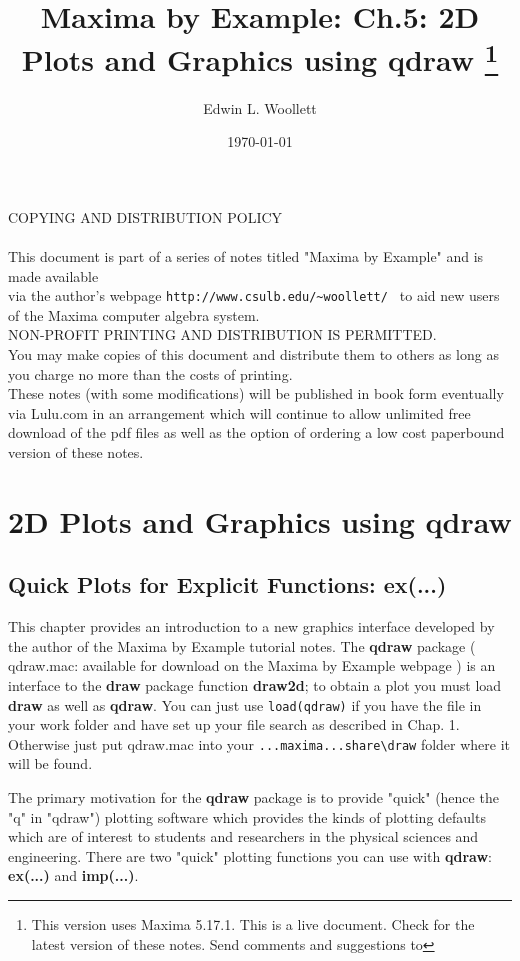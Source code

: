 \documentclass[12pt]{article}
\title{Maxima by Example: Ch.5: 2D Plots and Graphics using qdraw 
            \thanks{This version uses Maxima 5.17.1. This is a live
            document. Check \;  \tedhome \; for the latest version of these notes. Send comments and
			 suggestions to \tedmail } }
\author{Edwin L. Woollett}
\date{\today}
\begin{document}
\maketitle
\tableofcontents
{}
\newpage
\setcounter{section}{4}
\newpage
COPYING AND DISTRIBUTION POLICY\\
\\    
	
    
    This document is part of a series of notes titled
    "Maxima by Example" and	is made available\\
	via the author's webpage 
	\verb|http://www.csulb.edu/~woollett/ | to aid
	new users of the Maxima computer algebra system.\\
	
	\smallskip
	NON-PROFIT PRINTING AND DISTRIBUTION IS PERMITTED.\\
	You may make copies of this document and distribute them to others
	as long as you charge no more than the costs of printing.\\
	
	\smallskip
	These notes (with some modifications) will be published in book form
	eventually via Lulu.com in an arrangement which will continue
	to allow unlimited free download of the pdf files as well as the option
	of ordering a low cost paperbound version of these notes.
\newpage
\section{2D Plots and Graphics using qdraw}


\subsection{Quick Plots for Explicit Functions: ex(...)  }
This chapter provides an introduction to a new graphics interface developed by
  the author of the Maxima by Example tutorial notes.
The \textbf{qdraw} package ( qdraw.mac: available for download on the
  Maxima by Example webpage ) is an interface to the \textbf{draw}
  package function \textbf{draw2d}; to obtain a plot you must load \textbf{draw}
  as well as \textbf{qdraw}. You can just use \verb|load(qdraw)| if you have the file
  in your work folder and have set up your file search as described in Chap. 1.
  Otherwise just put qdraw.mac into your \verb|...maxima...share\draw| folder where it
  will be found.
  
\smallskip
The primary motivation for the \textbf{qdraw} package is to provide
  "quick" (hence the "q" in "qdraw") plotting software which provides
  the kinds of plotting defaults which are of interest to students
  and researchers in the physical sciences and engineering. There are  two "quick"
  plotting functions you can use with \textbf{qdraw}: \textbf{ex(...)} and
  \textbf{imp(...)}.
\end{document}
